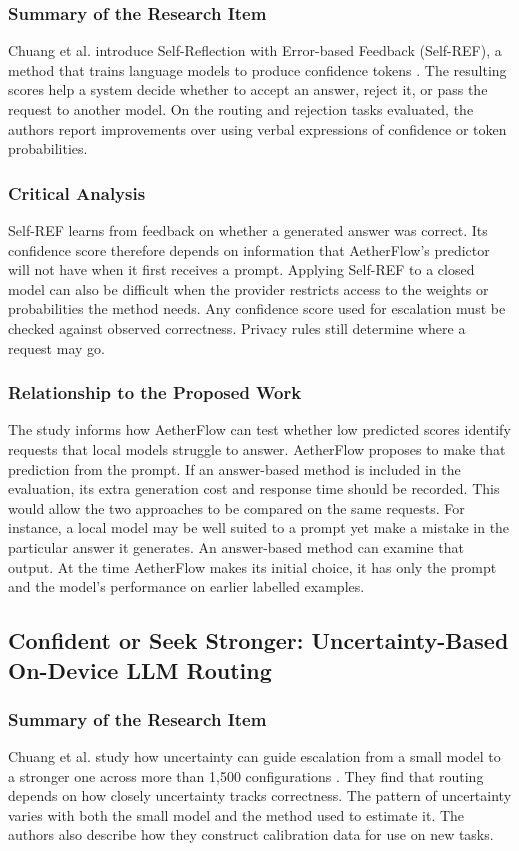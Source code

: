 \documentclass{FastFyp}
\begin{document}
\subsubsection{Summary of the Research Item}
Chuang et al. introduce Self-Reflection with Error-based Feedback (Self-REF), a method that trains language models to produce confidence tokens \cite{ref:SelfREF}. The resulting scores help a system decide whether to accept an answer, reject it, or pass the request to another model. On the routing and rejection tasks evaluated, the authors report improvements over using verbal expressions of confidence or token probabilities.

\subsubsection{Critical Analysis}
Self-REF learns from feedback on whether a generated answer was correct. Its confidence score therefore depends on information that AetherFlow's predictor will not have when it first receives a prompt. Applying Self-REF to a closed model can also be difficult when the provider restricts access to the weights or probabilities the method needs. Any confidence score used for escalation must be checked against observed correctness. Privacy rules still determine where a request may go.

\subsubsection{Relationship to the Proposed Work}
The study informs how AetherFlow can test whether low predicted scores identify requests that local models struggle to answer. AetherFlow proposes to make that prediction from the prompt. If an answer-based method is included in the evaluation, its extra generation cost and response time should be recorded. This would allow the two approaches to be compared on the same requests. For instance, a local model may be well suited to a prompt yet make a mistake in the particular answer it generates. An answer-based method can examine that output. At the time AetherFlow makes its initial choice, it has only the prompt and the model's performance on earlier labelled examples.

\subsection{Confident or Seek Stronger: Uncertainty-Based On-Device LLM Routing}
\subsubsection{Summary of the Research Item}
Chuang et al. study how uncertainty can guide escalation from a small model to a stronger one across more than 1,500 configurations \cite{ref:ConfidentOrSeekStronger}. They find that routing depends on how closely uncertainty tracks correctness. The pattern of uncertainty varies with both the small model and the method used to estimate it. The authors also describe how they construct calibration data for use on new tasks.
\end{document}
